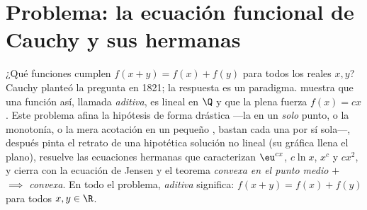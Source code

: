 \section{Problema: la ecuación funcional de Cauchy y sus hermanas}

\begin{problem}[{Problema del fin de semana --- $f(x + y) = f(x) + f(y)$:
la regularidad fuerza la linealidad, y el retrato de los monstruos}]
\label{pb:b1:continuity:1}
¿Qué funciones cumplen $f(x + y) = f(x) + f(y)$ para todos los reales
$x, y$? Cauchy planteó la pregunta en 1821; la respuesta es un
paradigma.  muestra que una función así,
llamada \emph{aditiva}, es lineal en $\Q$ y que la  plena
fuerza $f(x) = cx$. Este problema afina la hipótesis de forma
drástica ---la  en un \emph{solo} punto, o la monotonía,
o la mera acotación en un pequeño , bastan cada una por sí
sola---, después pinta el retrato de una hipotética solución no
lineal (su gráfica llena el plano), resuelve las ecuaciones hermanas
que caracterizan $\eu^{cx}$, $c\ln x$, $x^c$ y $cx^2$, y cierra con la
ecuación de Jensen y el teorema \emph{convexa en el punto medio $+$
 $\implies$ convexa}. En todo el problema, \emph{aditiva}
significa: $f(x + y) = f(x) + f(y)$ para todos $x, y \in \R$.


\end{problem}
